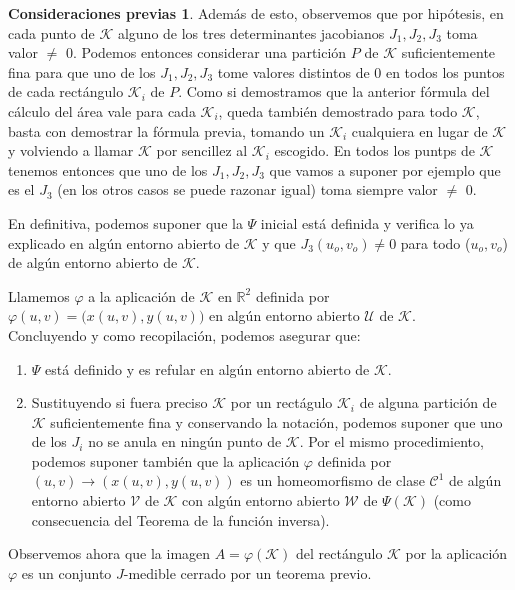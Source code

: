 \documentclass[12pt,twoside]{report}
\newcommand\mc[1]{\mathcal{#1}}
\theoremstyle{azul}
\theoremstyle{azul2}
\theoremstyle{plain}
\theoremstyle{definition}
\newtheorem*{consprev}{Consideraciones previas}
\theoremstyle{remark}
\begin{document}
\begin{consprev}
 Además de esto, observemos que por hipótesis, en cada punto de $\mc{K}$ alguno de los tres determinantes jacobianos $J_1, J_2, J_3$ toma valor $\neq$ 0. Podemos entonces considerar una partición $P$ de $\mc{K}$ suficientemente fina para que uno de los $J_1, J_2, J_3$ tome valores distintos de 0 en todos los puntos de cada rectángulo $\mc{K}_i$ de $P$. Como si demostramos que la anterior fórmula del cálculo del área vale para cada $\mc{K}_i$, queda también demostrado para todo $\mc{K}$, basta con demostrar la fórmula previa, tomando un $\mc{K}_i$ cualquiera en lugar de $\mc{K}$ y volviendo a llamar $\mc{K}$ por sencillez al $\mc{K}_i$ escogido. En todos los puntps de $\mc{K}$ tenemos entonces que uno de los $J_1, J_2, J_3$ que vamos a suponer por ejemplo que es el $J_3$ (en los otros casos se puede razonar igual) toma siempre valor $\neq$ 0. 
 
 En definitiva, podemos suponer que la $\Psi$ inicial está definida y verifica lo ya explicado en algún entorno abierto de $\mc{K}$ y que $J_3(u_o,v_o) \neq 0$ para todo ($u_o, v_o$) de algún entorno abierto de $\mc{K}$. 
 
 Llamemos $\varphi$ a la aplicación de $\mc{K}$ en $\mathbb{R}^2$ definida por $\varphi(u,v) = \big( x(u,v), y(u,v) \big)$ en algún entorno abierto $\mc{U}$ de $\mc{K}$. \\
Concluyendo y como recopilación, podemos asegurar que:
 \begin{enumerate}[(1)]
     \item $\Psi$ está definido y es refular en algún entorno abierto de $\mc{K}$.
     \item Sustituyendo si fuera preciso $\mc{K}$ por un rectágulo $\mc{K}_i$ de alguna partición de $\mc{K}$ suficientemente fina y conservando la notación, podemos suponer que uno de los $J_i$ no se anula en ningún punto de $\mc{K}$. Por el mismo procedimiento, podemos suponer también que la aplicación $\varphi$ definida por $(u,v) \longrightarrow (x(u,v), y(u,v))$ es un homeomorfismo de clase $\mc{C}^1$ de algún entorno abierto $\mc{V}$ de $\mc{K}$ con algún entorno abierto $\mc{W}$ de $\Psi(\mc{K})$ (como consecuencia del Teorema de la función inversa). 
 \end{enumerate}
 
 Observemos ahora que la imagen $A=\varphi(\mc{K})$ del rectángulo $\mc{K}$ por la aplicación $\varphi$ es un conjunto $J$-medible cerrado por un teorema previo. 
 

\end{consprev}
\end{document}
